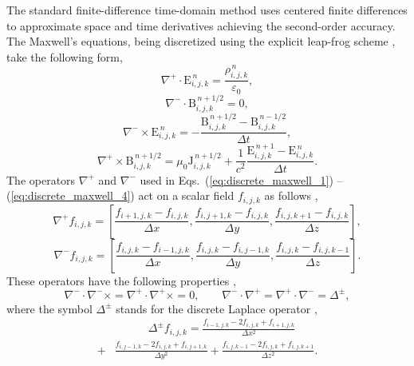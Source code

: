 \documentclass[10pt, a4paper, twoside, openright]{report}
\renewcommand{\vec}[1]{\boldsymbol{\mathrm{#1}}}
\begin{document}
The standard finite-difference time-domain method uses centered finite differences to approximate space and time derivatives achieving the second-order accuracy. The Maxwell's equations, being discretized using the explicit leap-frog scheme \cite{Press2007}, take the following form,
\begin{equation}\label{eq:discrete_maxwell_1}
	\nabla^{+} \cdot \vec{E}_{i, j, k}^{\,n} = \frac{\rho_{i, j, k}^{\,n}}{\varepsilon_0},
\end{equation}
\begin{equation}\label{eq:discrete_maxwell_2}
	\nabla^{-} \cdot \vec{B}_{i, j, k}^{\,n + 1/2} = 0,
\end{equation}
\begin{equation}\label{eq:discrete_maxwell_3}
	\nabla^{-} \times \vec{E}_{i, j, k}^{\,n} = -\frac{\vec{B}_{i, j, k}^{\,n + 1/2} - \vec{B}_{i, j, k}^{\,n - 1/2}}{\Delta t},
\end{equation}
\begin{equation}\label{eq:discrete_maxwell_4}
	\nabla^{+} \times \vec{B}_{i, j, k}^{\,n + 1/2} = \mu_{0} \vec{J}_{i, j, k}^{\,n + 1/2} + \frac{1}{c^{2}} \frac{\vec{E}_{i, j, k}^{\,n + 1} - \vec{E}_{i, j, k}^{\,n}}{\Delta t}.
\end{equation}
The operators $ \nabla^{+} $ and $ \nabla^{-} $ used in Eqs.~(\ref{eq:discrete_maxwell_1}) -- (\ref{eq:discrete_maxwell_4}) act on a scalar field $ f_{i, j, k} $ as follows \cite{Esirkepov2001},
\begin{equation}\label{eq:nabla_plus}
	\nabla^{+} f_{i, j, k} = \left[ \frac{f_{i + 1, j, k} - f_{i, j, k}}{\Delta x}, \frac{f_{i, j + 1, k} - f_{i, j, k}}{\Delta y}, \frac{f_{i, j, k + 1} - f_{i, j, k}}{\Delta z} \right], 
\end{equation}
\begin{equation}\label{eq:nabla_minus}
	\nabla^{-} f_{i, j, k} = \left[ \frac{f_{i, j, k} - f_{i - 1, j, k}}{\Delta x}, \frac{f_{i, j, k} - f_{i, j - 1, k}}{\Delta y}, \frac{f_{i, j, k} - f_{i, j, k - 1}}{\Delta z} \right].
\end{equation}
These operators have the following properties \cite{Esirkepov2001},
\begin{equation}\label{eq:nabla_properties}
	\nabla^{-} \cdot \nabla^{-} \times = \nabla^{+} \cdot \nabla^{+} \times = 0, \qquad \nabla^{-} \cdot \nabla^{+} = \nabla^{+} \cdot \nabla^{-} = \Delta^{\pm},
\end{equation}
where the symbol $ \Delta^{\pm} $ stands for the discrete Laplace operator \cite{Esirkepov2001},
\begin{equation}\label{eq:discrete_laplace}
	\begin{aligned}
	& \quad \quad \quad \Delta^{\pm} f_{i, j, k} = \frac{f_{i - 1, j, k} - 2 f_{i, j, k} + f_{i + 1, j, k}}{\Delta x^{2}} \\[3mm]
	+ & \frac{f_{i, j - 1, k} - 2 f_{i, j, k} + f_{i, j + 1, k}}{\Delta y^{2}} + \frac{f_{i, j, k - 1} - 2 f_{i, j, k} + f_{i, j, k + 1}}{\Delta z^{2}}.
	\end{aligned}
\end{equation}
\end{document}
